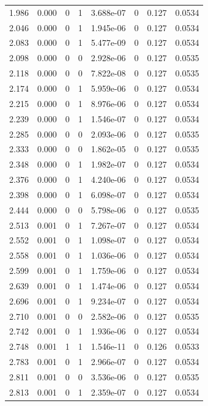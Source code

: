 \documentclass[preview]{standalone}
\begin{document}
{{{\begin{tabular}{L{1.2cm}C{1.2cm} C{0.3cm}C{0.5cm} C{1.4cm}C{1.4cm} C{1.4cm}C{1.4cm}}
  1.986  &  0.000  & 0     &  1 &  3.688e-07  & 0  & 0.127 &  0.0534   \\ 
  2.046  &  0.000  & 0     &  1 &  1.945e-06  & 0  & 0.127 &  0.0534   \\ 
  2.083  &  0.000  & 0     &  1 &  5.477e-09  & 0  & 0.127 &  0.0534   \\ 
  2.098  &  0.000  & 0     &  0 &  2.928e-06  & 0  & 0.127 &  0.0535   \\ 
  2.118  &  0.000  & 0     &  0 &  7.822e-08  & 0  & 0.127 &  0.0535   \\ 
  2.174  &  0.000  & 0     &  1 &  5.959e-06  & 0  & 0.127 &  0.0534   \\ 
  2.215  &  0.000  & 0     &  1 &  8.976e-06  & 0  & 0.127 &  0.0534   \\ 
  2.239  &  0.000  & 0     &  1 &  1.546e-07  & 0  & 0.127 &  0.0534   \\ 
  2.285  &  0.000  & 0     &  0 &  2.093e-06  & 0  & 0.127 &  0.0535   \\ 
  2.333  &  0.000  & 0     &  0 &  1.862e-05  & 0  & 0.127 &  0.0535   \\ 
  2.348  &  0.000  & 0     &  1 &  1.982e-07  & 0  & 0.127 &  0.0534   \\ 
  2.376  &  0.000  & 0     &  1 &  4.240e-06  & 0  & 0.127 &  0.0534   \\ 
  2.398  &  0.000  & 0     &  1 &  6.098e-07  & 0  & 0.127 &  0.0534   \\ 
  2.444  &  0.000  & 0     &  0 &  5.798e-06  & 0  & 0.127 &  0.0535   \\ 
  2.513  &  0.001  & 0     &  1 &  7.267e-07  & 0  & 0.127 &  0.0534   \\ 
  2.552  &  0.001  & 0     &  1 &  1.098e-07  & 0  & 0.127 &  0.0534   \\ 
  2.558  &  0.001  & 0     &  1 &  1.036e-06  & 0  & 0.127 &  0.0534   \\ 
  2.599  &  0.001  & 0     &  1 &  1.759e-06  & 0  & 0.127 &  0.0534   \\ 
  2.639  &  0.001  & 0     &  1 &  1.474e-06  & 0  & 0.127 &  0.0534   \\ 
  2.696  &  0.001  & 0     &  1 &  9.234e-07  & 0  & 0.127 &  0.0534   \\ 
  2.710  &  0.001  & 0     &  0 &  2.582e-06  & 0  & 0.127 &  0.0535   \\ 
  2.742  &  0.001  & 0     &  1 &  1.936e-06  & 0  & 0.127 &  0.0534   \\ 
  2.748  &  0.001  & 1     &  1 &  1.546e-11  & 0  & 0.126 &  0.0533   \\ 
  2.783  &  0.001  & 0     &  1 &  2.966e-07  & 0  & 0.127 &  0.0534   \\ 
  2.811  &  0.001  & 0     &  0 &  3.536e-06  & 0  & 0.127 &  0.0535   \\ 
  2.813  &  0.001  & 0     &  1 &  2.359e-07  & 0  & 0.127 &  0.0534   \\ 
\hline 
\end{tabular} 

}}}
\end{document}
